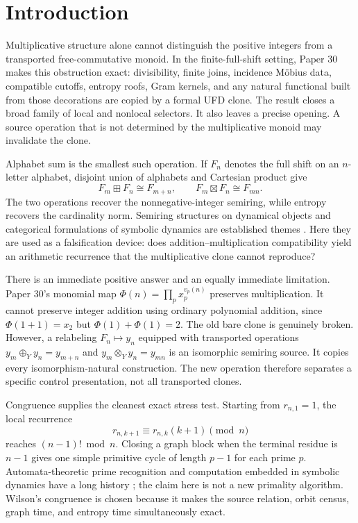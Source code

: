 \section{Introduction}
\label{sec:introduction}

Multiplicative structure alone cannot distinguish the positive integers from
a transported free-commutative monoid.  In the finite-full-shift setting,
Paper 30 makes this obstruction exact: divisibility, finite joins, incidence
Möbius data, compatible cutoffs, entropy roofs, Gram kernels, and any natural
functional built from those decorations are copied by a formal UFD clone.
The result closes a broad family of local and nonlocal selectors.  It also
leaves a precise opening.  A source operation that is not determined by the
multiplicative monoid may invalidate the clone.

Alphabet sum is the smallest such operation.  If $F_n$ denotes the full shift
on an $n$-letter alphabet, disjoint union of alphabets and Cartesian product
give
\[
  F_m\boxplus F_n\cong F_{m+n},
  \qquad
  F_m\boxtimes F_n\cong F_{mn}.
\]
The two operations recover the nonnegative-integer semiring, while entropy
recovers the cardinality norm.  Semiring structures on dynamical objects and
categorical formulations of symbolic dynamics are established themes
\citep{SaloTorma2015,NaquinGadouleau2024}.  Here they are used as a
falsification device: does addition--multiplication compatibility yield an
arithmetic recurrence that the multiplicative clone cannot reproduce?

There is an immediate positive answer and an equally immediate limitation.
Paper 30's monomial map $\Phi(n)=\prod_p x_p^{v_p(n)}$ preserves
multiplication.  It cannot preserve integer addition using ordinary
polynomial addition, since $\Phi(1+1)=x_2$ but
$\Phi(1)+\Phi(1)=2$.  The old bare clone is genuinely broken.  However, a
relabeling $F_n\mapsto y_n$ equipped with transported operations
$y_m\oplus_Yy_n=y_{m+n}$ and $y_m\otimes_Yy_n=y_{mn}$ is an isomorphic
semiring source.  It copies every isomorphism-natural construction.  The new
operation therefore separates a specific control presentation, not all
transported clones.

Congruence supplies the cleanest exact stress test.  Starting from
$r_{n,1}=1$, the local recurrence
\[
  r_{n,k+1}\equiv r_{n,k}(k+1)\pmod n
\]
reaches $(n-1)!\bmod n$.  Closing a graph block when the terminal residue is
$n-1$ gives one simple primitive cycle of length $p-1$ for each prime $p$.
Automata-theoretic prime recognition and computation embedded in symbolic
dynamics have a long history \citep{HartmanisShank1968,Kurka1997}; the claim
here is not a new primality algorithm.  Wilson's congruence is chosen because
it makes the source relation, orbit census, graph time, and entropy time
simultaneously exact.

